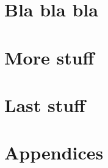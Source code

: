 \documentclass[a4paper, 11pt, twoside, openright, english]{memoir}
\begin{document}
\frontmatter




\mainmatter

\part{Bla bla bla}

\part{More stuff}

\part{Last stuff}

\appendix
\part{Appendices}

\backmatter

\end{document}
